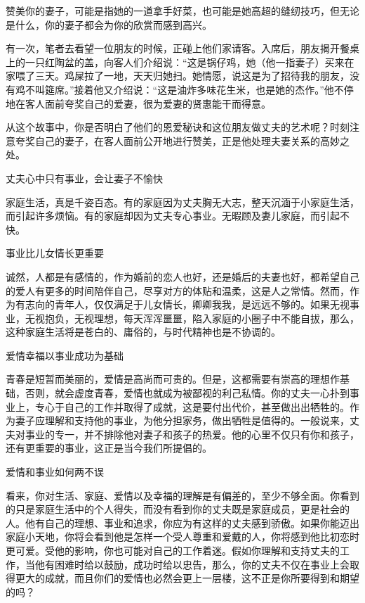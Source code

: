 \documentclass[12pt,UTF8]{ctexbook}
\begin{document}
赞美你的妻子，可能是指她的一道拿手好菜，也可能是她高超的缝纫技巧，但无论是什么，你的妻子都会为你的欣赏而感到高兴。

有一次，笔者去看望一位朋友的时候，正碰上他们家请客。入席后，朋友揭开餐桌上的一只红陶盆的盖，向客人们介绍说：“这是锅仔鸡，她（他一指妻子）买来在家喂了三天。鸡屎拉了一地，天天归她扫。她情愿，说这是为了招待我的朋友，没有鸡不叫筵席。”接着他又介绍说：“这是油炸多味花生米，也是她的杰作。”他不停地在客人面前夸奖自己的爱妻，很为爱妻的贤惠能干而得意。

从这个故事中，你是否明白了他们的恩爱秘诀和这位朋友做丈夫的艺术呢？时刻注意夸奖自己的妻子，在客人面前公开地进行赞美，正是他处理夫妻关系的高妙之处。





丈夫心中只有事业，会让妻子不愉快


家庭生活，真是千姿百态。有的家庭因为丈夫胸无大志，整天沉湎于小家庭生活，而引起许多烦恼。有的家庭却因为丈夫专心事业。无暇顾及妻儿家庭，而引起不快。





事业比儿女情长更重要


诚然，人都是有感情的，作为婚前的恋人也好，还是婚后的夫妻也好，都希望自己的爱人有更多的时间陪伴自己，尽享对方的体贴和温柔，这是人之常情。然而，作为有志向的青年人，仅仅满足于儿女情长，卿卿我我，是远远不够的。如果无视事业，无视抱负，无视理想，每天浑浑噩噩，陷入家庭的小圈子中不能自拔，那么，这种家庭生活将是苍白的、庸俗的，与时代精神也是不协调的。





爱情幸福以事业成功为基础


青春是短暂而美丽的，爱情是高尚而可贵的。但是，这都需要有崇高的理想作基础，否则，就会虚度青春，爱情也就成为被鄙视的利己私情。你的丈夫一心扑到事业上，专心于自己的工作并取得了成就，这是要付出代价，甚至做出出牺牲的。作为妻子应理解和支持他的事业，为他分担家务，做出牺牲是值得的。一般说来，丈夫对事业的专一，并不排除他对妻子和孩子的热爱。他的心里不仅只有你和孩子，还有更重要的事业，这正是当今我们所提倡的。





爱情和事业如何两不误


看来，你对生活、家庭、爱情以及幸福的理解是有偏差的，至少不够全面。你看到的只是家庭生活中的个人得失，而没有看到你的丈夫既是家庭成员，更是社会的人。他有自己的理想、事业和追求，你应为有这样的丈夫感到骄傲。如果你能迈出家庭小天地，你将会看到他是怎样一个受人尊重和爱戴的人，你将感到他比初恋时更可爱。受他的影响，你也可能对自己的工作着迷。假如你理解和支持丈夫的工作，当他有困难时给以鼓励，成功时给以忠告，那么，你的丈夫不仅在事业上会取得更大的成就，而且你们的爱情也必然会更上一层楼，这不正是你所要得到和期望的吗？
\end{document}
